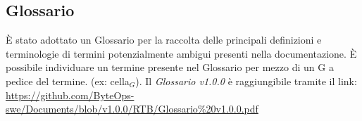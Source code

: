 \subsection{Glossario}
È stato adottato un Glossario per la raccolta delle principali definizioni e terminologie di termini potenzialmente ambigui presenti nella documentazione.
È possibile individuare un termine presente nel Glossario per mezzo di un G a pedice del termine.
(ex: cella\(_G\)).
\vspace{0.1cm}
Il \textit{Glossario v1.0.0} è raggiungibile tramite il link: \href{https://github.com/ByteOps-swe/Documents/blob/v1.0.0/RTB/Glossario%20v1.0.0.pdf}{https://github.com/ByteOps-swe/Documents/blob/v1.0.0/RTB/Glossario\%20v1.0.0.pdf}
